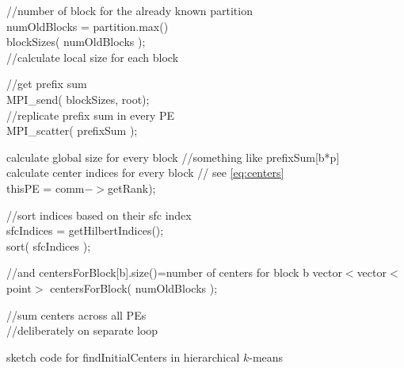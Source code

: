 \documentclass[a4paper,10pt]{article}
\begin{document}
\begin{algorithm}
//number of block for the already known partition\\
numOldBlocks = partition.max() \\
blockSizes( numOldBlocks ); \\
//calculate local size for each block\\
\BlankLine

//get prefix sum\\
MPI\_send( blockSizes, root);\\
//replicate prefix sum in every PE\\
MPI\_scatter( prefixSum );\\
\BlankLine

calculate global size for every block //something like prefixSum[b*p]\\
calculate center indices for every block // see \cref{eq:centers}\\
thisPE = comm$->$getRank);\\
\BlankLine

//sort indices based on their sfc index\\
sfcIndices = getHilbertIndices();\\
sort( sfcIndices );\\
\BlankLine

//and centersForBlock[b].size()=number of centers for block b
vector$<$vector$<$point$>$ centersForBlock( numOldBlocks );\\
\BlankLine

//sum centers across all PEs\\
//deliberately on separate loop\\
\caption{sketch code for findInitialCenters in hierarchical $k$-means}
\end{algorithm}
\end{document}
